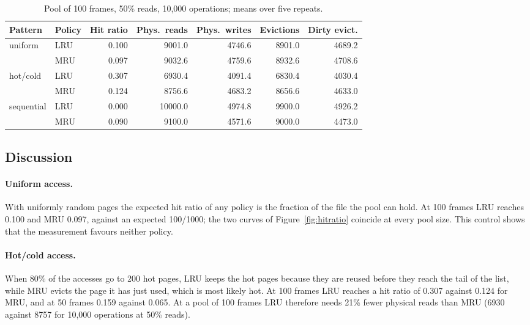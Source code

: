 \documentclass[11pt,a4paper]{article}
\begin{document}
\begin{table}[H]
\centering
\small
\caption{Pool of 100 frames, 50\% reads, 10{,}000 operations; means over five repeats.}
\label{tab:buffersummary}
\begin{tabular}{llrrrrr}
\toprule
Pattern & Policy & Hit ratio & Phys.\ reads & Phys.\ writes & Evictions & Dirty evict. \\
\midrule
uniform & LRU & 0.100 & 9001.0 & 4746.6 & 8901.0 & 4689.2 \\
 & MRU & 0.097 & 9032.6 & 4759.6 & 8932.6 & 4708.6 \\
\midrule
hot/cold & LRU & 0.307 & 6930.4 & 4091.4 & 6830.4 & 4030.4 \\
 & MRU & 0.124 & 8756.6 & 4683.2 & 8656.6 & 4633.0 \\
\midrule
sequential & LRU & 0.000 & 10000.0 & 4974.8 & 9900.0 & 4926.2 \\
 & MRU & 0.090 & 9100.0 & 4571.6 & 9000.0 & 4473.0 \\
\bottomrule
\end{tabular}
\end{table}

\subsection{Discussion}

\paragraph{Uniform access.} With uniformly random pages the expected hit ratio of any policy is the fraction of the file the pool can hold. At 100 frames LRU reaches 0.100 and MRU 0.097, against an expected 100/1000; the two curves of Figure~\ref{fig:hitratio} coincide at every pool size. This control shows that the measurement favours neither policy.

\paragraph{Hot/cold access.} When 80\% of the accesses go to 200 hot pages, LRU keeps the hot pages because they are reused before they reach the tail of the list, while MRU evicts the page it has just used, which is most likely hot. At 100 frames LRU reaches a hit ratio of 0.307 against 0.124 for MRU, and at 50 frames 0.159 against 0.065. At a pool of 100 frames LRU therefore needs 21\% fewer physical reads than MRU (6930 against 8757 for 10{,}000 operations at 50\% reads).
\end{document}
